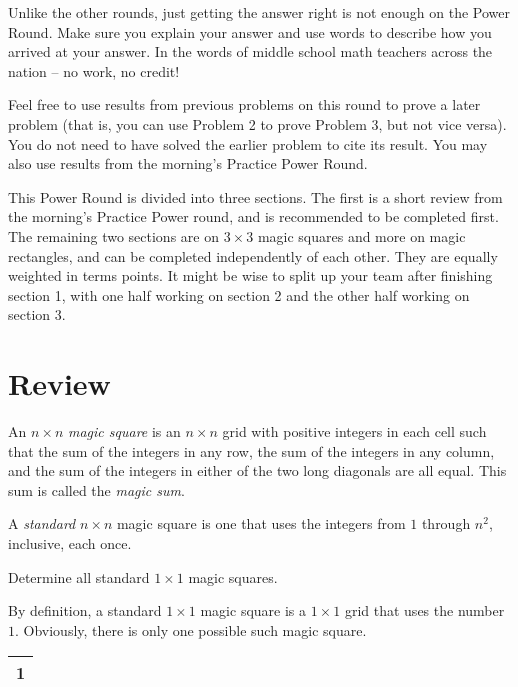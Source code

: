 \documentclass[11pt]{article}
\renewenvironment{problem}{\begin{problems}}{\end{problems}\vspace{5pt}}
\begin{document}
\setlength{\parindent}{0pt}

Unlike the other rounds, just getting the answer right is not enough on the Power Round. 
Make sure you explain your answer and use words to describe how you arrived at your answer. 
In the words of middle school math teachers across the nation -- no work, no credit! \newline

Feel free to use results from previous problems on this round to prove a later problem 
(that is, you can use Problem 2 to prove Problem 3, but not vice versa). 
You do not need to have solved the earlier problem to cite its result.
You may also use results from the morning's Practice Power Round. \newline

This Power Round is divided into three sections. The first is a short review from the morning's 
Practice Power round, and is recommended to be completed first. 
The remaining two sections are on $3 \times 3$ magic squares and more on magic rectangles, 
and can be completed independently of each other.  They are equally weighted in terms points.
It might be wise to split up your team after finishing section 1, with one half working on section 2 and the other half working on section 3.

\section{Review}

\begin{definition}
An $n \times n$ \textit{magic square} is an $n \times n$ grid with positive integers in each cell such that
the sum of the integers in any row, the sum of the integers in any column, and the sum of the integers
in either of the two long diagonals are all equal. This sum is called the \textit{magic sum}.
\end{definition}

\begin{definition}
A \textit{standard} $n \times n$ magic square is one that uses the integers from $1$ through $n^2$, inclusive, each once.
\end{definition}

\begin{problem}[1 point]
Determine all standard $1 \times 1$ magic squares.
\end{problem}

\begin{solution}
By definition, a standard $1 \times 1$ magic square is a $1 \times 1$ grid that uses the number $1$.
Obviously, there is only one possible such magic square.
\begin{center}
\begin{tabular}{|c|}
\hline
1 \\ \hline
\end{tabular}
\end{center}
\end{solution}
\end{document}
